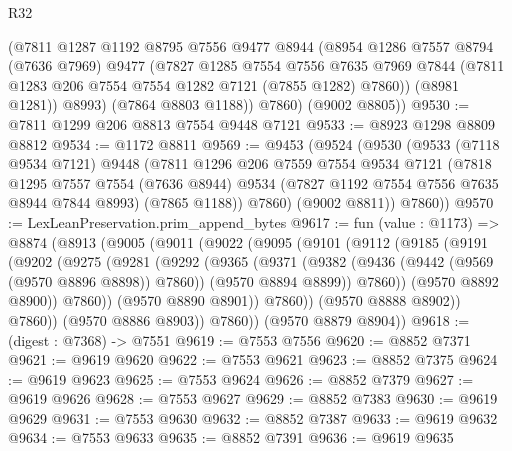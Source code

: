 \begin{lexlean}{R32}
\begin{coremodule}
          (@7811
            @1287
            @1192
            @8795
            @7556
            @9477
            @8944
            (@8954
              @1286
              @7557
              @8794
              (@7636 @7969)
              @9477
              (@7827
                @1285
                @7554
                @7556
                @7635
                @7969
                @7844
                (@7811 @1283 @206 @7554 @7554 @1282 @7121 (@7855 @1282) @7860))
              (@8981 @1281))
            @8993)
          (@7864 @8803 @1188))
        @7860)
      (@9002 @8805))
@9530 := @7811 @1299 @206 @8813 @7554 @9448 @7121
@9533 := @8923 @1298 @8809 @8812
@9534 := @1172 @8811
@9569 := @9453
    (@9524
      (@9530
        (@9533
          (@7118 @9534 @7121)
          @9448
          (@7811
            @1296
            @206
            @7559
            @7554
            @9534
            @7121
            (@7818
              @1295
              @7557
              @7554
              (@7636 @8944)
              @9534
              (@7827 @1192 @7554 @7556 @7635 @8944 @7844 @8993)
              (@7865 @1188))
            @7860)
          (@9002 @8811))
        @7860))
@9570 := LexLeanPreservation.prim_append_bytes
@9617 := fun (value : @1173) =>
  @8874
    (@8913
      (@9005
        (@9011
          (@9022
            (@9095
              (@9101
                (@9112
                  (@9185
                    (@9191
                      (@9202
                        (@9275
                          (@9281
                            (@9292
                              (@9365
                                (@9371
                                  (@9382
                                    (@9436 (@9442 (@9569 (@9570 @8896 @8898)) @7860))
                                    (@9570 @8894 @8899))
                                  @7860))
                              (@9570 @8892 @8900))
                            @7860))
                        (@9570 @8890 @8901))
                      @7860))
                  (@9570 @8888 @8902))
                @7860))
            (@9570 @8886 @8903))
          @7860))
      (@9570 @8879 @8904))
@9618 := (digest : @7368) -> @7551
@9619 := @7553 @7556
@9620 := @8852 @7371
@9621 := @9619 @9620
@9622 := @7553 @9621
@9623 := @8852 @7375
@9624 := @9619 @9623
@9625 := @7553 @9624
@9626 := @8852 @7379
@9627 := @9619 @9626
@9628 := @7553 @9627
@9629 := @8852 @7383
@9630 := @9619 @9629
@9631 := @7553 @9630
@9632 := @8852 @7387
@9633 := @9619 @9632
@9634 := @7553 @9633
@9635 := @8852 @7391
@9636 := @9619 @9635

\end{coremodule}
\end{lexlean}
